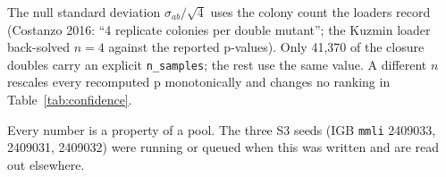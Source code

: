 The null standard deviation $\sigma_{ab}/\sqrt{4}$ uses the colony count the loaders
record (Costanzo 2016: ``4 replicate colonies per double mutant''; the Kuzmin loader
back-solved $n = 4$ against the reported p-values). Only 41{,}370 of the closure
doubles carry an explicit \texttt{n\_samples}; the rest use the same value. A
different $n$ rescales every recomputed p monotonically and changes no ranking in
Table~\ref{tab:confidence}.

Every number is a property of a pool. The three S3 seeds
(IGB \texttt{mmli} 2409033, 2409031, 2409032) were running or queued when this was
written and are read out elsewhere.
